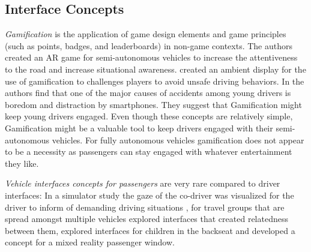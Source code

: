 \subsection{Interface Concepts}
\emph{Gamification} is the application of game design elements and game principles (such as points, badges, and leaderboards) in non-game contexts.
The authors \cite{Schroeter2016} created an AR game for semi-autonomous vehicles to increase the attentiveness to the road and increase situational awareness. \cite{Rodriguez2014} created an ambient display for the use of gamification to challenges players to avoid unsafe driving behaviors.  In \cite{Schroeter} the authors find that one of the major causes of accidents among young drivers is boredom and distraction by smartphones. They suggest that Gamification might keep young drivers engaged. Even though these concepts are relatively simple, Gamification might be a valuable tool to keep drivers engaged with their semi-autonomous vehicles. For fully autonomous vehicles gamification does not appear to be a necessity as passengers can stay engaged with whatever entertainment they like. 

\emph{Vehicle interfaces concepts for passengers} are very rare compared to driver interfaces: In a simulator study the gaze of the co-driver was visualized for the driver to inform of demanding driving situations \citet{Trosterer}, for travel groups that are spread amongst multiple vehicles \citet{Knobel2012} explored interfaces that created relatedness between them, \cite{Wilfinger2011} explored interfaces for children in the backseat and \citet{Hakkila2014} developed a concept for a mixed reality passenger window. 

